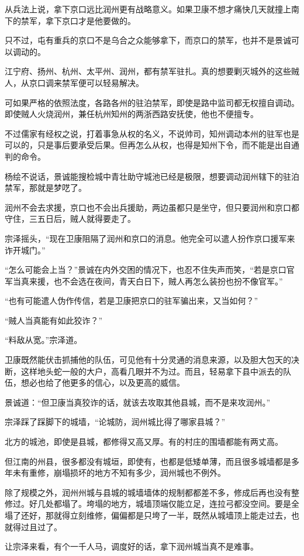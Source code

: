 从兵法上说，拿下京口远比润州更有战略意义。如果卫康不想才痛快几天就撞上南下的禁军，拿下京口才是他要做的。

只不过，屯有重兵的京口不是乌合之众能够拿下，而京口的禁军，也并不是景诚可以调动的。

江宁府、扬州、杭州、太平州、润州，都有禁军驻扎。真的想要剿灭城外的这些贼人，从京口调来禁军便可以轻易解决。

可如果严格的依照法度，各路各州的驻泊禁军，即使是路中监司都无权擅自调动。即使贼人火烧润州，兼任杭州知州的两浙西路安抚使，他也不便擅专。

不过儒家有经权之说，打着事急从权的名义，不说帅司，知州调动本州的驻军也是可以的，只是事后要承受后果。但再怎么从权，也得是知州下令，而不能是出自通判的命令。

杨绘不说话，景诚能搜检城中青壮助守城池已经是极限，想要调动润州辖下的驻泊禁军，那就是梦呓了。

润州不会去求援，京口也不会出兵援助，两边虽都只是坐守，但只要润州和京口都守住，三五日后，贼人就得要走了。

宗泽摇头，“现在卫康阻隔了润州和京口的消息。他完全可以遣人扮作京口援军来诈开城门。”

“怎么可能会上当？”景诚在内外交困的情况下，也忍不住失声而笑，“若是京口官军当真来援，也不会选在夜间，青天白日下，贼人再怎么装扮也扮不像官军。”

“也有可能遣人伪作传信，若是卫康把京口的驻军骗出来，又当如何？”

“贼人当真能有如此狡诈？”

“料敌从宽。”宗泽道。

卫康既然能伏击抓捕他的队伍，可见他有十分灵通的消息来源，以及胆大包天的决断，这样地头蛇一般的大户，高看几眼并不为过。而且，轻易拿下县中派去的队伍，想必也给了他更多的信心，以及更高的威信。

景诚道：“但卫康当真狡诈的话，就该去攻取其他县城，而不是来攻润州。”

宗泽踩了踩脚下的城墙，“论城防，润州城比得了哪家县城？”

北方的城池，即使是县城，都修得又高又厚。有的村庄的围墙都能有两丈高。

但江南的州县，很多都没有城垣，即使有，也都是低矮单薄，而且很多城墙都是多年未有重修，崩塌损坏的地方不知有多少，润州城也不例外。

除了规模之外，润州州城与县城的城墙墙体的规制都都差不多，修成后再也没有整修过。好几处都塌了。垮塌的地方，城墙顶端仅能立足，连拉弓都没空间。要是全塌了还好，那就得立刻维修，偏偏都是只垮了一半，既然从城墙顶上能走过去，也就得过且过了。

让宗泽来看，有个一千人马，调度好的话，拿下润州城当真不是难事。

